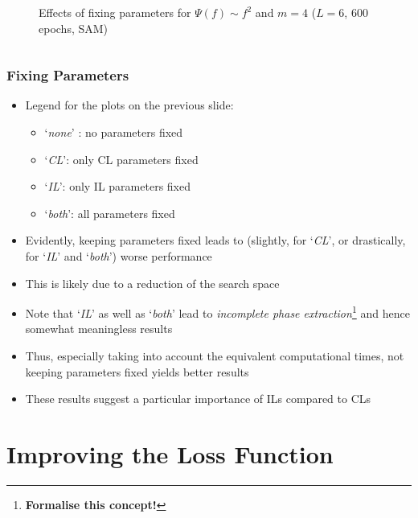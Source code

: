 \documentclass{beamer}
\begin{document}
\begin{frame}
\begin{columns}
\begin{column}{0.5\textwidth}
\begin{figure}
\caption{Effects of fixing parameters for $\Psi(f) \sim f^2$ and $m=4$ ($L=6$, 600 epochs, SAM)}
\end{figure}
\end{column}
\end{columns}
\end{frame}

\begin{frame}
\frametitle{Fixing Parameters}
\begin{itemize}
\item Legend for the plots on the previous slide:
\begin{itemize}
\item `\emph{none}' : no parameters fixed 
\item `\emph{CL}': only CL parameters fixed
\item `\emph{IL}': only IL parameters fixed 
\item `\emph{both}': all parameters fixed  
\end{itemize} 
\item Evidently, keeping parameters fixed leads to (slightly, for `\emph{CL}', or drastically, for `\emph{IL}' and `\emph{both}') \alert{worse performance} 
\item This is likely due to a reduction of the search space 
\item Note that `\emph{IL}' as well as `\emph{both}' lead to \alert{\emph{incomplete phase extraction}}\footnote{\textbf{Formalise this concept!}} and hence somewhat meaningless results 
\item Thus, especially taking into account the equivalent computational times, \alert{not keeping parameters fixed yields better results} 
\item These results suggest a particular importance of ILs compared to CLs 
\end{itemize}
\end{frame}

\section{Improving the Loss Function}
\end{document}
